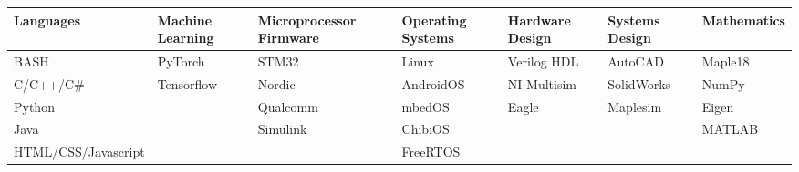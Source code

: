 
\begin{cvparagraph}

\begin{center}
  \begin{tabular}{L L L L L L L}
  Languages & Machine Learning & Microprocessor Firmware & Operating Systems & Hardware Design & Systems Design & Mathematics \\
  \hline
  BASH                 & PyTorch    & STM32    & Linux     & Verilog HDL & AutoCAD    & Maple18 \\
  C/C++/C\#            & Tensorflow & Nordic   & AndroidOS & NI Multisim & SolidWorks & NumPy   \\
  Python               &            & Qualcomm & mbedOS    & Eagle       & Maplesim   & Eigen   \\
  Java                 &            & Simulink & ChibiOS   &             &            & MATLAB  \\
  HTML/CSS/Javascript  &            &          & FreeRTOS  &             &            &         \\
  \end{tabular}
\end{center}
\end{cvparagraph}
